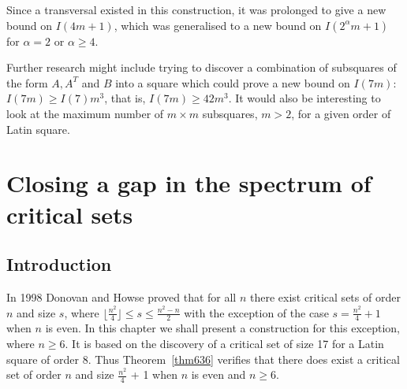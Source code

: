 \documentclass[12pt]{report}
\begin{document}
Since a transversal existed in this construction, it was prolonged to
give a new bound on $I(4m+1)$, which was generalised to a new bound on
$I(2^\alpha m+1)$ for $\alpha = 2$ or $\alpha \geq 4$.

Further research might include trying to discover a combination of
subsquares of the form $A, A^T$ and $B$ into a square which could prove a
new bound on $I(7m)$: $I(7m) \geq I(7) m^3$, that is, $I(7m) \geq 42 m^3$.
It would also be interesting to look at the maximum number of $m \times m$
subsquares, $m > 2$, for a given order of Latin square.

\chapter{Closing a gap in the spectrum of critical sets}\label{ch6}
\section{Introduction}
In 1998 Donovan and Howse proved that for all $n$ there exist critical
sets of order $n$ and size $s$, where $\lfloor \displaystyle{\frac{n^{2}}{4}} \rfloor
\leq s \leq \displaystyle{\frac{n^{2}-n}{2}}$ with the exception of the case $s =
\displaystyle{\frac{n^{2}}{4}} + 1$ when $n$ is even.  In this chapter we shall present a
construction for this exception, where $n \geq 6$.  It is based on the discovery of a
critical set of size 17 for a Latin square of order 8.  Thus Theorem~\ref{thm636} verifies
that there does exist a critical set of order $n$ and size $\displaystyle{\frac{n^{2}}{4}}$ + 1 when $n$
is even and $n \geq 6$.
%
\end{document}
